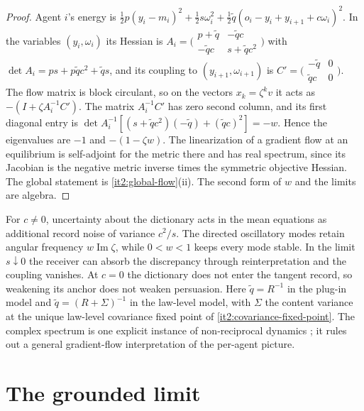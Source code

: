 \begin{proof}
Agent $i$'s energy is $\frac12p(y_i-m_i)^2+\frac12s\omega_i^2+\frac12\tilde q(o_i-y_i+y_{i+1}+c\omega_i)^2$. In the variables $(y_i,\omega_i)$ its Hessian is $A_i=\bigl(\begin{smallmatrix}p+\tilde q&-\tilde qc\\-\tilde qc&s+\tilde qc^2\end{smallmatrix}\bigr)$ with $\det A_i=ps+p\tilde qc^2+\tilde qs$, and its coupling to $(y_{i+1},\omega_{i+1})$ is $C'=\bigl(\begin{smallmatrix}-\tilde q&0\\\tilde qc&0\end{smallmatrix}\bigr)$. The flow matrix is block circulant, so on the vectors $x_k=\zeta^kv$ it acts as $-(I+\zeta A_i^{-1}C')$. The matrix $A_i^{-1}C'$ has zero second column, and its first diagonal entry is $\det A_i^{-1}[(s+\tilde qc^2)(-\tilde q)+(\tilde qc)^2]=-w$. Hence the eigenvalues are $-1$ and $-(1-\zeta w)$. The linearization of a gradient flow at an equilibrium is self-adjoint for the metric there and has real spectrum, since its Jacobian is the negative metric inverse times the symmetric objective Hessian. The global statement is \cref{it2:global-flow}(ii). The second form of $w$ and the limits are algebra.
\end{proof}

For $c\neq0$, uncertainty about the dictionary acts in the mean equations as additional record noise of variance $c^2/s$. The directed oscillatory modes retain angular frequency $w\operatorname{Im}\zeta$, while $0<w<1$ keeps every mode stable. In the limit $s\downarrow0$ the receiver can absorb the discrepancy through reinterpretation and the coupling vanishes. At $c=0$ the dictionary does not enter the tangent record, so weakening its anchor does not weaken persuasion. Here $\tilde q=R^{-1}$ in the plug-in model and $\tilde q=(R+\Sigma)^{-1}$ in the law-level model, with $\Sigma$ the content variance at the unique law-level covariance fixed point of \cref{it2:covariance-fixed-point}. The complex spectrum is one explicit instance of non-reciprocal dynamics \citep{FruchartEtAl2021}; it rules out a general gradient-flow interpretation of the per-agent picture.

\section{The grounded limit}
\label{it2:ch-grounded}

